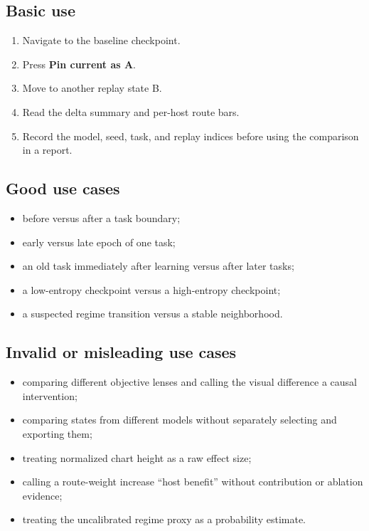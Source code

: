 \documentclass[11pt,a4paper]{article}
\newcommand{\ui}[1]{\textsf{\bfseries #1}}
\begin{document}
\subsection{Basic use}

\begin{enumerate}
  \item Navigate to the baseline checkpoint.
  \item Press \ui{Pin current as A}.
  \item Move to another replay state B.
  \item Read the delta summary and per-host route bars.
  \item Record the model, seed, task, and replay indices before using the comparison in a report.
\end{enumerate}

\subsection{Good use cases}

\begin{itemize}
  \item before versus after a task boundary;
  \item early versus late epoch of one task;
  \item an old task immediately after learning versus after later tasks;
  \item a low-entropy checkpoint versus a high-entropy checkpoint;
  \item a suspected regime transition versus a stable neighborhood.
\end{itemize}

\subsection{Invalid or misleading use cases}

\begin{itemize}
  \item comparing different objective lenses and calling the visual difference a causal intervention;
  \item comparing states from different models without separately selecting and exporting them;
  \item treating normalized chart height as a raw effect size;
  \item calling a route-weight increase ``host benefit'' without contribution or ablation evidence;
  \item treating the uncalibrated regime proxy as a probability estimate.
\end{itemize}
\end{document}
